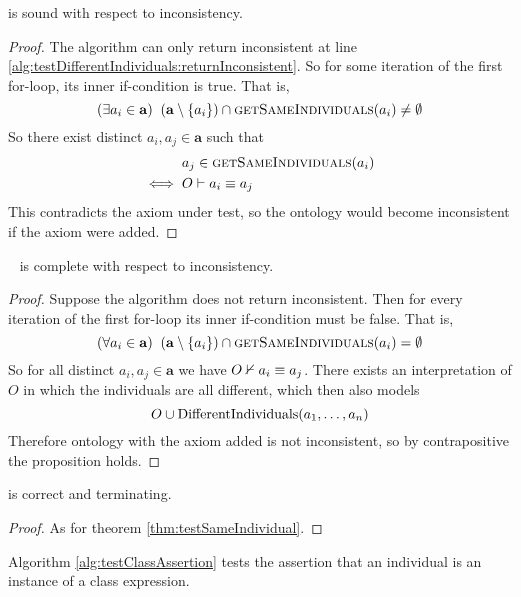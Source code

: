 \documentclass[paper.tex]{subfiles}
\begin{document}
\begin{proposition}
  \sloppy
   is sound with respect to inconsistency.
\end{proposition}
\begin{proof}
  The algorithm can only return inconsistent at line \ref{alg:testDifferentIndividuals:returnInconsistent}.  So for some iteration of the first for-loop, its inner if-condition is true.  That is,
  \[ (\exists a_i \in \mathbf{a}) \;\; (\mathbf{a} \setminus \{a_i\}) \intersect \Call{getSameIndividuals}{a_i} \ne \emptyset \]
  So there exist distinct $a_i, a_j \in \mathbf{a}$ such that
  \begin{align*}
    & a_j \in \Call{getSameIndividuals}{a_i} \\
    \iff{}& O \sementails a_i \equiv a_j
  \end{align*}
  This contradicts the axiom under test, so the ontology would become inconsistent if the axiom were added.
\end{proof}

\begin{proposition}
  \sloppy~
   is complete with respect to inconsistency.
\end{proposition}
\begin{proof}
  Suppose the algorithm does not return inconsistent.  Then for every iteration of the first for-loop its inner if-condition must be false.  That is,
  \[ (\forall a_i \in \mathbf{a}) \;\; (\mathbf{a} \setminus \{a_i\}) \intersect \Call{getSameIndividuals}{a_i} = \emptyset \]
  So for all distinct $a_i, a_j \in \mathbf{a}$ we have $O \nvdash a_i \equiv a_j$.  There exists an interpretation of $O$ in which the individuals are all different, which then also models
  \[ O \cup \mathrm{DifferentIndividuals}(a_1, \ldots, a_n) \]
  Therefore ontology with the axiom added is not inconsistent, so by contrapositive the proposition holds.
\end{proof}

\begin{theorem}
   is correct and terminating.
\end{theorem}
\begin{proof}
  As for theorem \ref{thm:testSameIndividual}.
\end{proof}

Algorithm \ref{alg:testClassAssertion} tests the assertion that an individual is an instance of a class expression.
\end{document}
